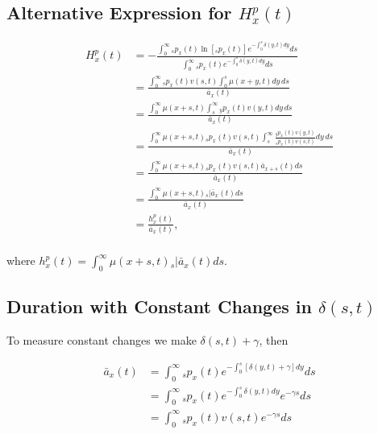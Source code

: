 \documentclass[12pt]{article}
\begin{document}
{\subsection{Alternative Expression for ${H}^{p}_{x}(t)$}\label{sec:EntropyAlt}

\begin{equation} \label{eq:EntropyAnnuityA1}
\begin{split}
{H}^{p}_{x}(t) &= -\frac{ \int_{0}^{\infty}{}_sp_x(t)\ln[{}_sp_x(t)] e^{-\int_{0}^{s}\delta(y,t)dy} ds}{\int_0^\infty {}_sp_x(t) e^{-\int_{0}^{s}\delta(y,t)dy} ds}\\
&= \frac{\int_0^\infty {}_sp_x(t) {v}(s,t) \int_0^s \mu(x+y,t) dy\,ds}{\bar{a}_x(t)}\\
&= \frac{\int_0^\infty  \mu(x+s,t) \int_s^\infty {}_yp_x(t) {v}(y,t)  dy\,ds}{\bar{a}_x(t)}\\
&= \frac{\int_0^\infty  \mu(x+s,t)  {}_sp_x(t) {v}(s,t) \int_s^\infty \frac{ {}_yp_x(t) {v}(y,t)}{ {}_sp_x(t) {v}(s,t)}  dy\,ds}{\bar{a}_x(t)}\\
&=  \frac{\int_0^\infty \mu(x+s,t)   {}_sp_x(t) {v}(s,t) \bar{a}_{x+s}(t) ds}{\bar{a}_x(t)} \\
&=  \frac{\int_0^\infty \mu(x+s,t)  {}_s|\bar{a}_x(t) ds}{\bar{a}_x(t)} \\
&=  \frac{{h}^{p}_{x}(t)}{\bar{a}_x(t)}, \\
\end{split}
\end{equation}

where ${h}^{p}_{x}(t)=\int_0^\infty \mu(x+s,t)   {}_s|\bar{a}_x(t) ds$.



\subsection{Duration with Constant Changes in $\delta(s,t)$}\label{sec:DurConst}

To measure constant changes we make $\delta(s,t)+\gamma$, then

\begin{equation}\label{eq:DurationConst1}
\begin{split}
\bar{a}_{x}(t) &= \int_0^\infty {}_sp_x(t) e^{- \int_{0}^{s} [\delta(y,t)+\gamma]dy}ds \\
&= \int_0^\infty {}_sp_x(t) e^{- \int_{0}^{s}\delta(y,t)dy}e^{-\gamma s}ds \\
&= \int_0^\infty {}_sp_x(t) {v}(s,t)e^{-\gamma s}ds
\end{split}
\end{equation}

}
\end{document}
